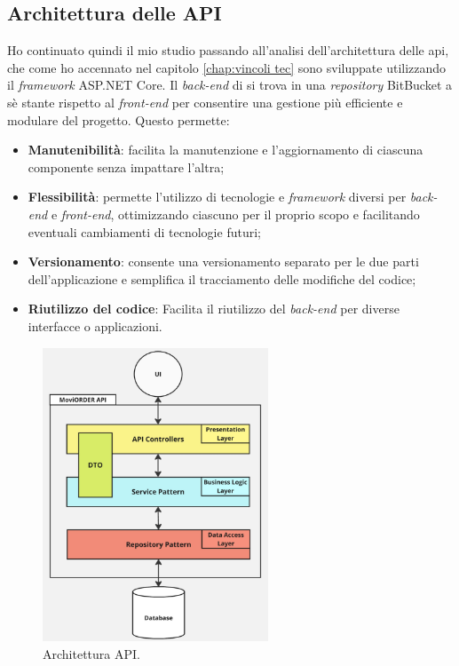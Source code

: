 \subsection{Architettura delle API}
Ho continuato quindi il mio studio passando all'analisi dell'architettura delle \gls{api}, che come ho accennato nel capitolo 
\ref{chap:vincoli tec} sono sviluppate utilizzando il \textit{framework} ASP.NET Core. 
Il \textit{back-end} di {\movi} si trova in una \textit{repository} BitBucket a sè stante rispetto al \textit{front-end} per consentire 
una gestione più efficiente e modulare del progetto. Questo permette: 
\begin{itemize}
    \item \textbf{Manutenibilità}: facilita la manutenzione e l'aggiornamento di ciascuna componente senza impattare l'altra;
    \item \textbf{Flessibilità}: permette l'utilizzo di tecnologie e \textit{framework} diversi per \textit{back-end} e 
          \textit{front-end}, ottimizzando ciascuno per il proprio scopo e facilitando eventuali cambiamenti di tecnologie futuri;
    \item \textbf{Versionamento}: consente una versionamento separato per le due parti dell'applicazione e semplifica il 
          tracciamento delle modifiche del codice;
    \item \textbf{Riutilizzo del codice}: Facilita il riutilizzo del \textit{back-end} per diverse interfacce o applicazioni.
\end{itemize}

\begin{figure}[H]
    \centering
    \includegraphics[width=0.6\textwidth]{img/repository-service.jpg}
    \caption{Architettura API.}
    \label{fig:repository-service}
\end{figure}

